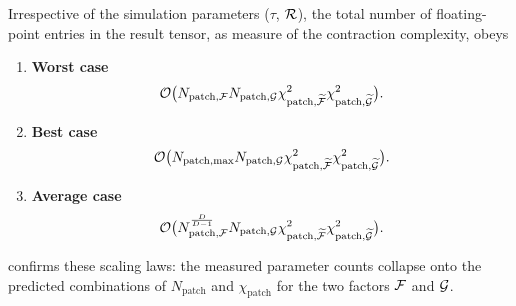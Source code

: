 Irrespective of the simulation parameters ($\tau$, $\mathcal{R}$), the total number of floating-point entries in the result tensor, as measure of the contraction complexity, obeys 
\begingroup
\renewcommand{\labelenumi}{(\alph{enumi})}
    \begin{enumerate}
        \item \textbf{Worst case}
        \begin{equation}
          \mathcal{O} \bigl( N_{\text{patch},\mathcal{F}}N_{\text{patch},\mathcal{G}} \chi^2_{\text{patch},\widetilde{\mathcal{F}}}\chi^2_{\text{patch},\widetilde{\mathcal{G}}} \bigr).
            \label{eq:newworstScalingApp}
        \end{equation}
      \item \textbf{Best case}
        \begin{equation}
          \mathcal{O} \bigl( N_{\text{patch},\text{max}}N_{\text{patch},\mathcal{G}} \chi^2_{\text{patch},\widetilde{\mathcal{F}}}\chi^2_{\text{patch},\widetilde{\mathcal{G}}} \bigr). 
            \label{eq:newbestScalingApp}
        \end{equation}

     \item \textbf{Average case}
     \begin{equation}
          \mathcal{O} \bigl( N^{\frac{D}{D-1}}_{\text{patch},\mathcal{F}}N_{\text{patch},\mathcal{G}} \chi^2_{\text{patch},\widetilde{\mathcal{F}}}\chi^2_{\text{patch},\widetilde{\mathcal{G}}} \bigr).
          \label{eq:newaverageScalingApp}
      \end{equation}
    \end{enumerate}
\endgroup

 confirms these scaling laws: the measured parameter counts collapse onto the predicted combinations of \(N_{\text{patch}}\) and \(\chi_{\text{patch}}\) for the two factors $\mathcal{F}$ and $\mathcal{G}$.

